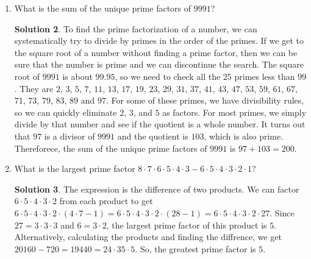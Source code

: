 \documentclass[twocolumn]{article}
\theoremstyle{definition}
\newtheorem*{solution}{Solution}
\begin{document}
\begin{enumerate}
\begin{solution}
            $(\num{9876543210})$ and modify it as necessary. It is already divisible by
            $9$ and $10$, but not by $8$ and $11$. For $11$, the digit sum is $45$, so
            the sum of alternating digits cannot be equal. The difference must be $11$
            with alternating digit sums of $17$ and $28$. $\num{9876543210}$ has alternating
            digit sums of $25$ and $20$, so we must increase the digit sum of $9 + 7 + 5
            + 3 + 1$ to $28$. Trading the $1$ for a $4$ is the best way to do this. Leave
            the largest five digits in order of the left and the zero on the right. Look
            for arrangements of the underlined digits which make the number divisible by
            $8$ while maintaining the alternating digit sums. $98765\underline{24310}$
            is not divisible by $8$, neither is $98765\underline{23140}$, but
            $\num{9876513240}$ is.
        \end{solution}
    \item What is the sum of the unique prime factors of $9991$?
        \begin{solution}
            To find the prime factorization of a number, we can systematically try to divide
            by primes in the order of the primes. If we get to the square root of a number
            without finding a prime factor, then we can be sure that the number is prime and
            we can discontinue the search. The square root of $9991$ is about $99.95$, so we
            need to check all the $25$ primes less than $99$. They are $2$, $3$, $5$, $7$, $11$,
            $13$, $17$, $19$, $23$, $29$, $31$, $37$, $41$, $43$, $47$, $53$, $59$, $61$, $67$,
            $71$, $73$, $79$, $83$, $89$ and $97$. For some of these primes, we have divisibility
            rules, so we can quickly eliminate $2$, $3$, and $5$ as factors. For most primes,
            we simply divide by that number and see if the quotient is a whole number. It turns
            out that $97$ is a divisor of $9991$ and the quotient is $103$, which is also prime.
            Thereforece, the sum of the unique prime factors of $9991$ is $97 + 103 = 200$.
        \end{solution}
    \item What is the largest prime factor $8 \cdot 7 \cdot 6 \cdot 5 \cdot 4 \cdot 3 -
        6 \cdot 5 \cdot 4 \cdot 3 \cdot 2 \cdot 1$?
        \begin{solution}
            The expression is the difference of two products. We can factor $6 \cdot 5 \cdot 4
            \cdot 3 \cdot 2$ from each product to get $6 \cdot 5 \cdot 4 \cdot 3 \cdot 2 \cdot
            (4 \cdot 7 - 1) = 6 \cdot 5 \cdot 4 \cdot 3 \cdot 2 \cdot (28 - 1) = 6 \cdot 5 \cdot 4
            \cdot 3 \cdot 2 \cdot 27$. Since $27 = 3 \cdot 3 \cdot 3$ and $6 = 3 \cdot 2$, the
            largest prime factor of this product is $5$. Alternatively, calculating the products
            and finding the diffrence, we get $\num{20160} - 720 = \num{19440} = 24 \cdot 35 \cdot 5$.
            So, the greatest prime factor is $5$.
        \end{solution}
\end{enumerate}
\end{document}
